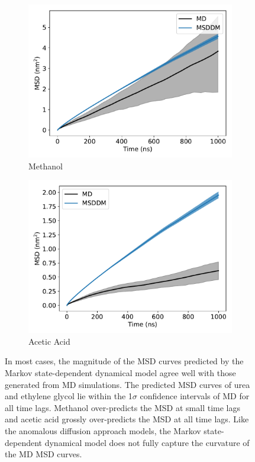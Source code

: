 \documentclass[journal=jctcce,manuscript=article]{achemso}
\begin{document}
\begin{figure}
\begin{subfigure}{0.45\textwidth}
  \includegraphics[width=\textwidth]{MET_msddm.pdf}
  \caption{Methanol}\label{fig:MET_msddm}
  \end{subfigure}
  \begin{subfigure}{0.45\textwidth}
  \includegraphics[width=\textwidth]{ACH_msddm.pdf}
  \caption{Acetic Acid}\label{fig:ACH_msddm}
  \end{subfigure}
  \caption{In most cases, the magnitude of the MSD curves predicted by the
	  Markov state-dependent dynamical model agree well with those generated 
	  from MD simulations. The predicted MSD curves of urea and ethylene 
	  glycol lie within the 1$\sigma$ confidence intervals of MD for all 
	  time lags. Methanol over-predicts the MSD at small time lags and 
	  acetic acid grossly over-predicts the MSD at all time lags.  Like the
	  anomalous diffusion approach models, the Markov state-dependent dynamical
	  model does not fully capture the curvature of the MD MSD curves.
	  }\label{fig:msddm_performance}
  \end{figure}
  
\end{document}
